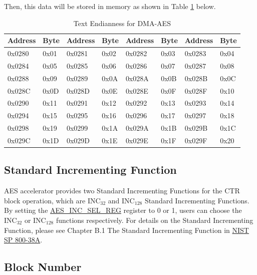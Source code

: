 \documentclass[main\_\_EN.tex]{subfiles}
\begin{document}
Then, this data will be stored in memory as shown in Table \ref{tab:aes-dma-aes-plaintext-ciphertext-endian} below. 

\begin{longtable}[c]
{ | l | l |l | l | l | l | l | l |}
\caption{Text Endianness for DMA-AES} 
\label{tab:aes-dma-aes-plaintext-ciphertext-endian}\\
\hline 
\rowcolor{lightgray}
\textbf{Address} &  \textbf{Byte}  & \textbf{Address} &  \textbf{Byte}  & \textbf{Address} &  \textbf{Byte}  & \textbf{Address} &  \textbf{Byte} \\\hline
0x0280 & 0x01 & 0x0281 & 0x02 & 0x0282 & 0x03 & 0x0283 & 0x04 \\\hline 
0x0284 & 0x05 & 0x0285 & 0x06 & 0x0286 & 0x07 & 0x0287 & 0x08 \\\hline 
0x0288 & 0x09 & 0x0289 & 0x0A & 0x028A & 0x0B & 0x028B & 0x0C \\\hline 
0x028C & 0x0D & 0x028D & 0x0E & 0x028E & 0x0F & 0x028F & 0x10 \\\hline 
0x0290 & 0x11 & 0x0291 & 0x12 & 0x0292 & 0x13 & 0x0293 & 0x14 \\\hline 
0x0294 & 0x15 & 0x0295 & 0x16 & 0x0296 & 0x17 & 0x0297 & 0x18 \\\hline 
0x0298 & 0x19 & 0x0299 & 0x1A & 0x029A & 0x1B & 0x029B & 0x1C \\\hline 
0x029C & 0x1D & 0x029D & 0x1E & 0x029E & 0x1F & 0x029F & 0x20 \\\hline  
\end{longtable}
\subsection{Standard Incrementing Function}\label{sec:aes-Standard-Incrementing-Function}

AES accelerator provides two Standard Incrementing Functions for the CTR block operation, which are INC$_{32}$ and INC$_{128}$ Standard Incrementing Functions. By setting the  \hyperref[regdesc:AESINCSELREG]{AES\_INC\_SEL\_REG} register to 0 or 1, users can choose the INC$_{32}$ or INC$_{128}$ functions respectively. For details on the Standard Incrementing Function, please see Chapter B.1 The Standard Incrementing Function in \href{https://nvlpubs.nist.gov/nistpubs/Legacy/SP/nistspecialpublication800-38a.pdf}{NIST SP 800-38A}.

\subsection{Block Number}\label{sec:aes-block-number}
\end{document}
